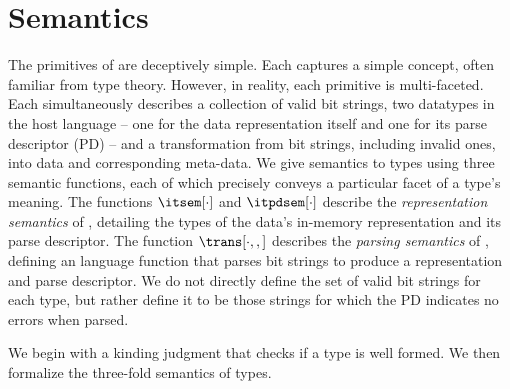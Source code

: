\section{\ddc{} Semantics}
\label{sec:ddc-sem}

The primitives of \ddc{} are deceptively simple.  Each captures a
simple concept, often familiar from type theory. However, in reality,
each primitive is multi-faceted. Each simultaneously describes a
collection of valid bit strings, two datatypes in the host language --
one for the data representation itself and one for its parse
descriptor (PD) -- and a transformation from bit strings, including
invalid ones, into data and corresponding meta-data.
%
%
We give semantics to \ddc{} types using three semantic functions, each of which
precisely conveys a particular facet of a type's meaning.
The functions $\itsem[\cdot]$ and $\itpdsem[\cdot]$ describe the {\it
representation semantics} of \ddc{}, detailing the types of the
data's in-memory representation and its parse descriptor. The function $\trans[\cdot,,]$ describes the
{\it parsing semantics} of \ddc{}, defining an \implang{} language function that parses bit strings to produce a representation and parse descriptor. We do not directly define the set of valid bit strings
for each type, but rather define it to be those strings for which the PD
indicates no errors when parsed.

We begin with a kinding judgment that checks if
a type is well formed. We then formalize
the three-fold semantics of \ddc{} types.

